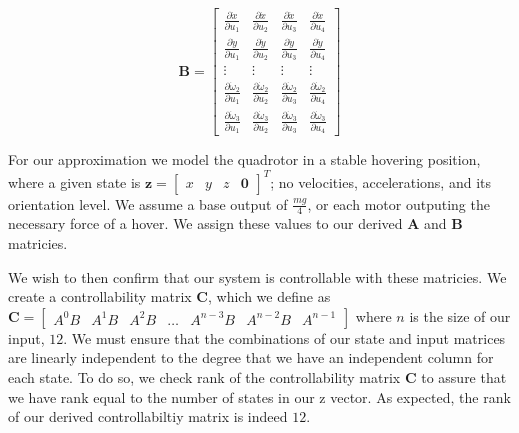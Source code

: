 \documentclass{article}
\begin{document}
\begin{multicols}{2}
\begin{equation}
    \boldsymbol{B} = \begin{bmatrix}
        \frac{\partial \dot{x}}{\partial u_1} &
        \frac{\partial \dot{x}}{\partial u_2} &
        \frac{\partial \dot{x}}{\partial u_3} &
        \frac{\partial \dot{x}}{\partial u_4}
        \\[4pt]
        \frac{\partial \dot{y}}{\partial u_1} &
        \frac{\partial \dot{y}}{\partial u_2} &
        \frac{\partial \dot{y}}{\partial u_3} &
        \frac{\partial \dot{y}}{\partial u_4}
        \\[4pt]
        \vdots & \vdots & \vdots & \vdots
        \\[4pt]
        \frac{\partial \dot{\omega}_2}{\partial u_1} &
        \frac{\partial \dot{\omega}_2}{\partial u_2} &
        \frac{\partial \dot{\omega}_2}{\partial u_3} &
        \frac{\partial \dot{\omega}_2}{\partial u_4}
        \\[4pt]
        \frac{\partial \dot{\omega}_3}{\partial u_1} &
        \frac{\partial \dot{\omega}_3}{\partial u_2} &
        \frac{\partial \dot{\omega}_3}{\partial u_3} &
        \frac{\partial \dot{\omega}_3}{\partial u_4}
    \end{bmatrix}
\end{equation}

For our approximation we model the quadrotor in a stable hovering position, where a given state is $\boldsymbol{z}=\begin{bmatrix} x & y & z & \boldsymbol{0}\end{bmatrix}^T$; no velocities, accelerations, and its orientation level. We assume a base output of $\frac{mg}{4}$, or each motor outputing the necessary force of a hover. We assign these values to our derived $\boldsymbol{A}$ and $\boldsymbol{B}$ matricies.

We wish to then confirm that our system is controllable with these matricies. We create a controllability matrix $\boldsymbol{C}$, which we define as $\boldsymbol{C} = \begin{bmatrix} A^0B & A^1B & A^2B & \dots & A^{n-3}B & A^{n-2}B & A^{n-1}\end{bmatrix}$ where $n$ is the size of our input, $12$. We must ensure that the combinations of our state and input matrices are linearly independent to the degree that we have an independent column for each state. To do so, we check rank of the controllability matrix $\boldsymbol{C}$ to assure that we have rank equal to the number of states in our z vector. As expected, the rank of our derived controllabiltiy matrix is indeed $12$.


\end{multicols}
\end{document}
